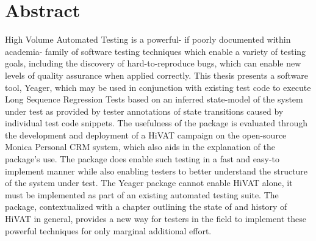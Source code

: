 \doublespacing
\chapter*{Abstract}
\abstract{}
 High Volume Automated Testing is a powerful- if poorly documented within academia- family of software testing techniques which enable a variety of testing goals, including the discovery of hard-to-reproduce bugs, which can enable new levels of quality assurance when applied correctly. This thesis presents a software tool, Yeager, which may be used in conjunction with existing test code to execute Long Sequence Regression Tests based on an inferred state-model of the system under test as provided by tester annotations of state transitions caused by individual test code snippets. The usefulness of the package is evaluated through the development and deployment of a HiVAT campaign on the open-source Monica Personal CRM system, which also aids in the explanation of the package's use. The package does enable such testing in a fast and easy-to implement manner while also enabling testers to better understand the structure of the system under test. The Yeager package cannot enable HiVAT alone, it must be implemented as part of an existing automated testing suite. The package, contextualized with a chapter outlining the state of and history of HiVAT in general, provides a new way for testers in the field to implement these powerful techniques for only marginal additional effort.
